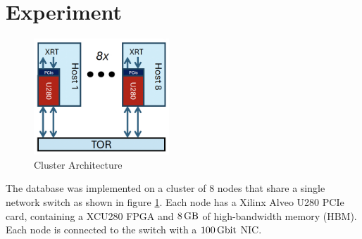 \section{Experiment}

\begin{figure}
	\centering
	\includegraphics[width=2in]{oct-arch.jpg}
	\caption{Cluster Architecture}
	\label{oct-arch}
\end{figure}

The database was implemented on a cluster of 8 nodes that share a single network switch as shown in figure \ref{oct-arch}. Each node has a Xilinx Alveo U280 PCIe card, containing a XCU280 FPGA and $\SI{8}{\giga\byte}$ of high-bandwidth memory (HBM). Each node is connected to the switch with a $\SI{100}{\giga\bit}$ NIC.
